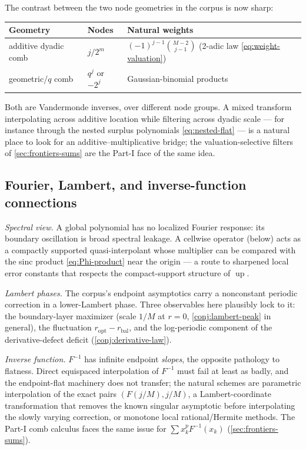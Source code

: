 \documentclass[11pt,oneside]{article}
\numberwithin{equation}{section}
\theoremstyle{definition}
\theoremstyle{remark}
\newcommand{\Up}{\operatorname{up}}
\begin{document}
The contrast between the two node geometries in the corpus is now
sharp:
\begin{center}
\small
\begin{tabular}{@{}lll@{}}
\toprule
Geometry & Nodes & Natural weights\\
\midrule
additive dyadic comb & $j/2^{m}$ & $(-1)^{j-1}\binom{M-2}{j-1}$
(2-adic law \eqref{eq:weight-valuation})\\
geometric/$q$ comb & $q^{j}$ or $-2^{j}$ & Gaussian-binomial products\\
\bottomrule
\end{tabular}
\end{center}
Both are Vandermonde inverses, over different node groups.  A mixed
transform interpolating across additive location while filtering
across dyadic scale --- for instance through the nested surplus
polynomials \eqref{eq:nested-flat} --- is a natural place to look for
an additive--multiplicative bridge; the valuation-selective filters of
\cref{sec:frontiers-sums} are the Part-I face of the same idea.

\subsection{Fourier, Lambert, and inverse-function connections}

\emph{Spectral view.}  A global polynomial has no localized Fourier
response: its boundary oscillation is broad spectral leakage.  A
cellwise operator (below) acts as a compactly supported
quasi-interpolant whose multiplier can be compared with the sinc
product \eqref{eq:Phi-product} near the origin --- a route to
sharpened local error constants that respects the compact-support
structure of $\Up$.

\emph{Lambert phases.}  The corpus's endpoint asymptotics carry a
nonconstant periodic correction in a lower-Lambert phase.  Three
observables here plausibly lock to it: the boundary-layer maximizer
(scale $1/M$ at $r=0$, \cref{conj:lambert-peak} in general), the
fluctuation $r_{\mathrm{opt}}-r_{\mathrm{bal}}$, and the log-periodic
component of the derivative-defect deficit
(\cref{conj:derivative-law}).

\emph{Inverse function.}  $F^{-1}$ has infinite endpoint
\emph{slopes}, the opposite pathology to flatness.  Direct equispaced
interpolation of $F^{-1}$ must fail at least as badly, and the
endpoint-flat machinery does not transfer; the natural schemes are
parametric interpolation of the exact pairs $(F(j/M),j/M)$, a
Lambert-coordinate transformation that removes the known singular
asymptotic before interpolating the slowly varying correction, or
monotone local rational/Hermite methods.  The Part-I comb calculus
faces the same issue for $\sum x_k^{p}F^{-1}(x_k)$
(\cref{sec:frontiers-sums}).
\end{document}

